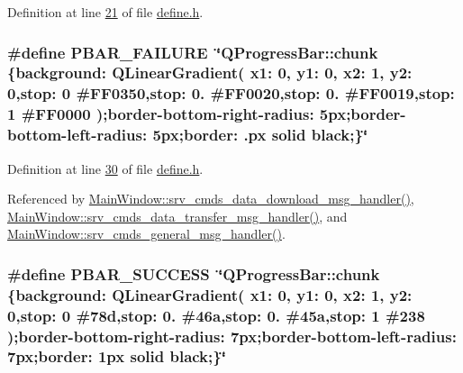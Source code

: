 Definition at line \hyperlink{a00034_source_l00021}{21} of file \hyperlink{a00034_source}{define.\+h}.

\hypertarget{a00034_aa9f43b2774395af6510910f8feed7cb4}{
\subsubsection[{P\+B\+A\+R\+\_\+\+F\+A\+I\+L\+U\+R\+E}]{\setlength{\rightskip}{0pt plus 5cm}\#define P\+B\+A\+R\+\_\+\+F\+A\+I\+L\+U\+R\+E~\char`\"{}Q\+Progress\+Bar\+::chunk \{background\+: Q\+Linear\+Gradient( x1\+: 0, y1\+: 0, x2\+: 1, y2\+: 0,stop\+: 0 \#F\+F0350,stop\+: 0. \#F\+F0020,stop\+: 0. \#F\+F0019,stop\+: 1 \#F\+F0000 );border-\/bottom-\/right-\/radius\+: 5px;border-\/bottom-\/left-\/radius\+: 5px;border\+: .\+px solid black;\}\char`\"{}}}\label{a00034_aa9f43b2774395af6510910f8feed7cb4}


Definition at line \hyperlink{a00034_source_l00030}{30} of file \hyperlink{a00034_source}{define.\+h}.



Referenced by \hyperlink{a00049_source_l00588}{Main\+Window\+::srv\+\_\+cmds\+\_\+data\+\_\+download\+\_\+msg\+\_\+handler()}, \hyperlink{a00049_source_l00437}{Main\+Window\+::srv\+\_\+cmds\+\_\+data\+\_\+transfer\+\_\+msg\+\_\+handler()}, and \hyperlink{a00049_source_l00293}{Main\+Window\+::srv\+\_\+cmds\+\_\+general\+\_\+msg\+\_\+handler()}.

\hypertarget{a00034_a1ff3389746e26aa43aed6c6b7c9997bd}{
\subsubsection[{P\+B\+A\+R\+\_\+\+S\+U\+C\+C\+E\+S\+S}]{\setlength{\rightskip}{0pt plus 5cm}\#define P\+B\+A\+R\+\_\+\+S\+U\+C\+C\+E\+S\+S~\char`\"{}Q\+Progress\+Bar\+::chunk \{background\+: Q\+Linear\+Gradient( x1\+: 0, y1\+: 0, x2\+: 1, y2\+: 0,stop\+: 0 \#78d,stop\+: 0. \#46a,stop\+: 0. \#45a,stop\+: 1 \#238 );border-\/bottom-\/right-\/radius\+: 7px;border-\/bottom-\/left-\/radius\+: 7px;border\+: 1px solid black;\}\char`\"{}}}\label{a00034_a1ff3389746e26aa43aed6c6b7c9997bd}


